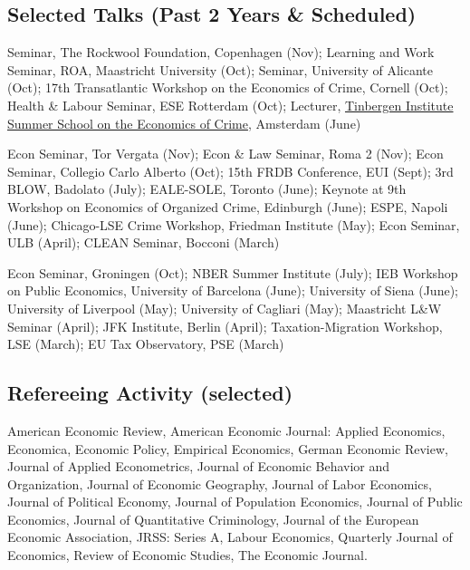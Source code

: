 \documentclass[11pt,a4paper]{article}
\begin{document}
\subsection{Selected Talks (Past 2 Years \& Scheduled)}
\begin{datelist}
  \item[2026] Seminar, The Rockwool Foundation, Copenhagen (Nov); Learning and Work Seminar, ROA, Maastricht University (Oct); Seminar, University of Alicante (Oct); 17th Transatlantic Workshop on the Economics of Crime, Cornell (Oct); Health \& Labour Seminar, ESE Rotterdam (Oct); Lecturer, \href{https://tinbergen.nl/the-economics-of-crime}{Tinbergen Institute Summer School on the Economics of Crime}, Amsterdam (June)
  \item[2025] Econ Seminar, Tor Vergata (Nov); Econ \& Law Seminar, Roma 2 (Nov); Econ Seminar, Collegio Carlo Alberto (Oct); 15th FRDB Conference, EUI (Sept); 3rd BLOW, Badolato (July); EALE-SOLE, Toronto (June); Keynote at 9th Workshop on Economics of Organized Crime, Edinburgh (June); ESPE, Napoli (June); Chicago-LSE Crime Workshop, Friedman Institute (May); Econ Seminar, ULB (April); CLEAN Seminar, Bocconi (March)
  \item[2024] Econ Seminar, Groningen (Oct); NBER Summer Institute (July); IEB Workshop on Public Economics, University of Barcelona (June); University of Siena (June); University of Liverpool (May); University of Cagliari (May); Maastricht L\&W Seminar (April); JFK Institute, Berlin (April); Taxation-Migration Workshop, LSE (March); EU Tax Observatory, PSE (March)
\end{datelist}

\subsection{Refereeing Activity (selected)}
American Economic Review, American Economic Journal: Applied Economics, Economica, Economic Policy, Empirical Economics, German Economic Review, Journal of Applied Econometrics, Journal of Economic Behavior and Organization, Journal of Economic Geography, Journal of Labor Economics, Journal of Political Economy, Journal of Population Economics, Journal of Public Economics, Journal of Quantitative Criminology, Journal of the European Economic Association, JRSS: Series A, Labour Economics, Quarterly Journal of Economics, Review of Economic Studies, The Economic Journal.
\end{document}
